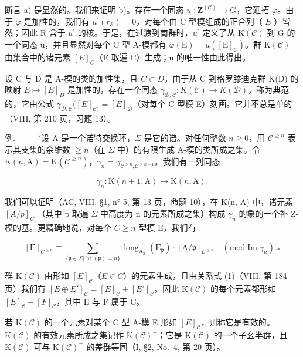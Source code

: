 断言 a) 是显然的。我们来证明 b)。存在一个同态 \(u^{\prime}: \mathbf{Z}^{(\mathcal{C})} \to \mathrm{G}\)，它延拓 \(\varphi\)。由于 \(\varphi\) 是加性的，我们有 \(u^{\prime}(r_{\mathcal{E}}) = 0\)，对每个由 C 型模组成的正合列（ \(E\) ）皆然；因此 R 含于 \(u^{\prime}\) 的核。于是，在过渡到商群时，\(u^{\prime}\) 定义了从 \(\mathrm{K}(\mathcal{C})\) 到 G 的一个同态 u，并且显然对每个 C 型 A-模都有 \(\varphi(\mathrm{E}) = u([\mathrm{E}]_{\mathcal{C}})\)。群 \(\mathrm{K}(\mathcal{C})\) 由集合中的诸元素 \([E]_{C}\)（E 取遍 C）生成；u 的唯一性由此得出。

设 C 与 D 是 A-模的类的加性集，且 \(C \subset D\)。由于从 C 到格罗滕迪克群 K(D) 的映射 \(E \mapsto [E]_{D}\) 是加性的，存在一个同态 \(\gamma_{\mathcal{D},\mathcal{C}} : K(\mathcal{C}) \to K(\mathcal{D})\)，称为典范的，它由公式 \(\gamma_{\mathcal{D},\mathcal{C}}([E]_{\mathcal{C})} = [E]_{\mathcal{D}}\)（对每个 C 型模 E）刻画。它并不总是单的（VIII, 第 210 页，习题 13）。

例. —— *设 A 是一个诺特交换环，\(\Sigma\) 是它的谱。对任何整数 \(n \geqslant 0\)，用 \(\mathcal{C}^{\geqslant n}\) 表示其支集的余维数 \(\geqslant n\)（在 \(\Sigma\) 中）的有限生成 A-模的类所成之集。令 \(\mathrm{K}(n,\mathrm{A}) = \mathrm{K}(\mathcal{C}^{\geqslant n})\)，\(\gamma_{n} = \gamma_{\mathcal{C}^{\geqslant n},\mathcal{C}^{\geqslant n + 1}}\)。我们有一列同态

\[
\gamma_ {n}: \mathrm{K} (n + 1, \mathrm{A}) \longrightarrow \mathrm{K} (n, \mathrm{A}).
\]

我们可以证明（AC, VIII, §1, n° 5, 第 13 页，命题 10），在 K(n, A) 中，诸元素 \([A/p]_{C_{n}}\)（其中 p 取遍 \(\Sigma\) 中高度为 n 的元素所成之集）构成 \(\gamma_{n}\) 的象的一个补 Z-模的基。更精确地说，对每个 \(C \geqslant n\) 型模 E，我们有

\[
[ \mathrm{E} ] _ {\mathcal {C} ^ {\geqslant n}} \equiv \sum_ {\{\mathfrak {p} \in \Sigma | \operatorname{ht} (\mathfrak {p}) = n \}} \operatorname{long} _ {\mathrm{A} _ {\mathfrak {p}}} (\mathrm{E} _ {\mathfrak {p}}) \cdot [ \mathrm{A} / \mathfrak {p} ] _ {\mathcal {C} ^ {\geqslant n}} \quad (\mathrm{mod} \operatorname{Im} \gamma_ {n}). _ {*}
\]

群 \(\mathrm{K}(\mathcal{C})\) 由形如 \([E]_{\mathcal{C}}\)（\(E \in C\)）的元素生成，且由关系式 (1)（VIII, 第 184 页）我们有 \([E \oplus E']_{\mathcal{C}} = [E]_{\mathcal{C}} + [E']_{\mathcal{C}}\)。因此 \(\mathrm{K}(\mathcal{C})\) 的每个元素都形如 \([E]_{\mathcal{C}} - [F]_{\mathcal{C}}\)，其中 E 与 F 属于 C。

若 \(\mathrm{K}(\mathcal{C})\) 的一个元素对某个 C 型 A-模 E 形如 \([E]_{\mathcal{C}}\)，则称它是有效的。\(\mathrm{K}(\mathcal{C})\) 的有效元素所成之集记作 \(\mathrm{K}(\mathcal{C})^{+}\)；它是 \(\mathrm{K}(\mathcal{C})\) 的一个子幺半群，且 \(\mathrm{K}(\mathcal{C})\) 可与 \(\mathrm{K}(\mathcal{C})^{+}\) 的差群等同（I, §2, No.~4, 第 20 页）。

